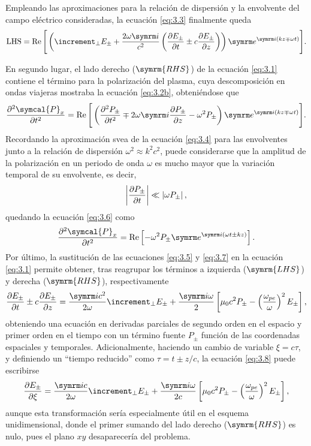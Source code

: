 Empleando las aproximaciones para la relación de dispersión y la envolvente del campo eléctrico consideradas, la ecuación \eqref{eq:3.3} finalmente queda
\begin{equation}\label{eq:3.5}
  \mathrm{LHS} =
  \RE \Bigg[\left(\laplacian_{\perp}E_{\pm } + \frac{2 \omega \iu }{c^{2}} \left(\pdv{E_{\pm }}{t} \pm c \pdv{E_{\pm }}{z}\right)\right)\eu^{\iu (kz \mp \omega t)}\Bigg].
\end{equation}

En segundo lugar, el lado derecho ($\symrm{RHS}$) de la ecuación \eqref{eq:3.1} contiene el término para la polarización del plasma, cuya descomposición en ondas viajeras mostraba la ecuación \eqref{eq:3.2b}, obteniéndose que
\begin{equation}\label{eq:3.6}
  \pdvN{\symcal{P}_{x}}{t}{2} = 
  \RE \Bigg[\left(\pdvN{P_{\pm }}{t}{2} \mp 2 \omega \iu \pdv{P_{\pm }}{z} - \omega^{2}P_{\pm }\right)\eu^{\iu (kz \mp \omega t)}\Bigg].
\end{equation}
Recordando la aproximación \acrshort{svea} de la ecuación \eqref{eq:3.4} para las envolventes junto a la relación de dispersión $\omega^{2} \approx k^{2}c^{2}$, puede considerarse que la amplitud de la polarización en un periodo de onda $\omega$ es mucho mayor que la variación temporal de su envolvente, es decir,
\begin{equation}
  \left|\frac{\partial P_{\pm }}{\partial t}\right| \ll \left|\omega P_{\pm }\right|,
\end{equation}
quedando la ecuación \eqref{eq:3.6} como
\begin{equation}\label{eq:3.7}
  \pdvN{\symcal{P}_{x}}{t}{2} = \RE \left[- \omega^{2}P_{\pm }\eu^{\iu (\omega t \pm kz)}\right].
\end{equation}
Por último, la sustitución de las ecuaciones \eqref{eq:3.5} y \eqref{eq:3.7} en la ecuación \eqref{eq:3.1} permite obtener, tras reagrupar los términos a izquierda ($\symrm{LHS}$) y derecha ($\symrm{RHS}$), respectivamente
\begin{equation}\label{eq:3.8}
  \pdv{E_{\pm }}{t} \pm c \pdv{E_{\pm }}{z} = \frac{\iu c^{2}}{2 \omega}\laplacian_{\perp}E_{\pm } + \frac{\iu \omega}{2} \left[\mu_{0}c^{2}P_{\pm } - \left(\frac{\omega_{pe}}{\omega}\right)^{2}E_{\pm }\right],
\end{equation}
obteniendo una ecuación en derivadas parciales de segundo orden en el espacio y primer orden en el tiempo con un término fuente $P_{\pm}$ función de las coordenadas espaciales y temporales. Adicionalmente, haciendo un cambio de variable $\xi = c \tau$, y definiendo un \enquote{tiempo reducido} como $\tau = t \pm z/c$, la ecuación \eqref{eq:3.8} puede escribirse 
\begin{equation}
  \pdv{E_{\pm }}{\xi} = \frac{\iu c}{2 \omega}\laplacian_{\perp}E_{\pm } + \frac{\iu \omega}{2c} \left[\mu_{0}c^{2}P_{\pm } - \left(\frac{\omega_{pe}}{\omega}\right)^{2}E_{\pm }\right],
\end{equation}
aunque esta transformación sería especialmente útil en el esquema unidimensional, donde el primer sumando del lado derecho ($\symrm{RHS}$) es nulo, pues el plano $xy$ desaparecería del problema.

